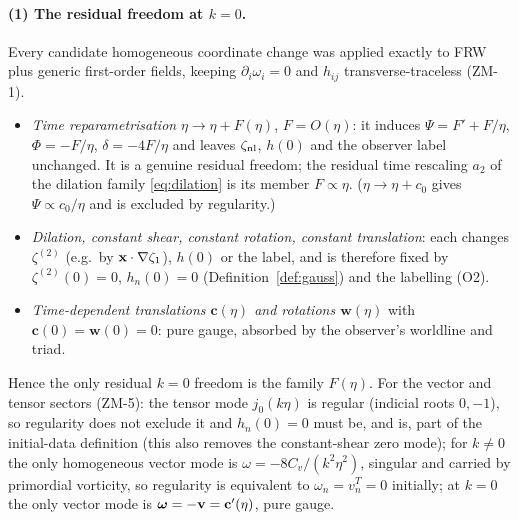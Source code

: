 \paragraph{(1) The residual freedom at $k=0$.}  Every candidate homogeneous coordinate change was applied exactly to FRW plus generic first-order
fields, keeping $\partial_i\omega_i=0$ and $h_{ij}$ transverse-traceless (ZM-1).
\begin{itemize}\itemsep1pt
\item \emph{Time reparametrisation} $\eta\to\eta+F(\eta)$, $F=O(\eta)$: it induces $\Psi=F'+F/\eta$, $\Phi=-F/\eta$, $\delta=-4F/\eta$ and leaves
$\zeta_{\rm nl}$, $h(0)$ and the observer label unchanged.  It is a genuine residual freedom; the residual time rescaling $a_2$ of the dilation
family \eqref{eq:dilation} is its member $F\propto\eta$.  ($\eta\to\eta+c_0$ gives $\Psi\propto c_0/\eta$ and is excluded by regularity.)
\item \emph{Dilation, constant shear, constant rotation, constant translation}: each changes $\zeta^{(2)}$ (e.g.\ by $\mathbf x\cdot\nabla\zeta_1$), $h(0)$
or the label, and is therefore fixed by $\zeta^{(2)}(0)=0$, $h_n(0)=0$ (Definition~\ref{def:gauss}) and the labelling (O2).
\item \emph{Time-dependent translations $\mathbf c(\eta)$ and rotations $\mathbf w(\eta)$} with $\mathbf c(0)=\mathbf w(0)=0$: pure gauge, absorbed by the
observer's worldline and triad.
\end{itemize}
Hence the only residual $k=0$ freedom is the family $F(\eta)$.  For the vector and tensor sectors (ZM-5): the tensor mode $j_0(k\eta)$ is regular
(indicial roots $0,-1$), so regularity does not exclude it and $h_n(0)=0$ must be, and is, part of the initial-data definition (this also removes the
constant-shear zero mode); for $k\ne0$ the only homogeneous vector mode is $\omega=-8C_v/(k^2\eta^2)$, singular and carried by primordial vorticity, so
regularity is equivalent to $\omega_n=v^T_n=0$ initially; at $k=0$ the only vector mode is $\boldsymbol\omega=-\mathbf v=\mathbf c'(\eta)$, pure gauge.

